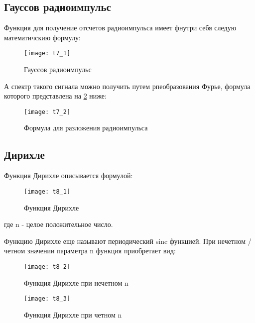 \subsection{Гауссов радиоимпульс}
Функция для получение отсчетов радиоимпульса имеет фнутри себя следую математичскию формулу:
\begin{figure}[H]
	\begin{center}
		\texttt{[image: t7\_1]}
		\caption{Гауссов радиоимпульс} 
		\label{pic:t7_1} %
	\end{center}
\end{figure}
А спектр такого сигнала можно получить путем рпеобразования Фурье, формула которого представлена на \ref{pic:t7_2} ниже:
\begin{figure}[H]
	\begin{center}
		\texttt{[image: t7\_2]}
		\caption{Формула для разложения радиоимпульса} 
		\label{pic:t7_2} %
	\end{center}
\end{figure}

\subsection{Дирихле}
Функция Дирихле описывается формулой:
\begin{figure}[H]
	\begin{center}
		\texttt{[image: t8\_1]}
		\caption{Функция Дирихле} 
		\label{pic:t8_1} %
	\end{center}
\end{figure}
где n - целое положительное число.

Функцию Дирихле еще называют периодический sinc функцией.
При нечетном / четном значении параметра n функция приобретает вид:
\begin{figure}[H]
	\begin{center}
		\texttt{[image: t8\_2]}
		\caption{Функция Дирихле при нечетном n} 
		\label{pic:t8_2} %
	\end{center}
\end{figure}
\begin{figure}[H]
	\begin{center}
		\texttt{[image: t8\_3]}
		\caption{Функция Дирихле при четном n} 
		\label{pic:t8_3} %
	\end{center}
\end{figure}


